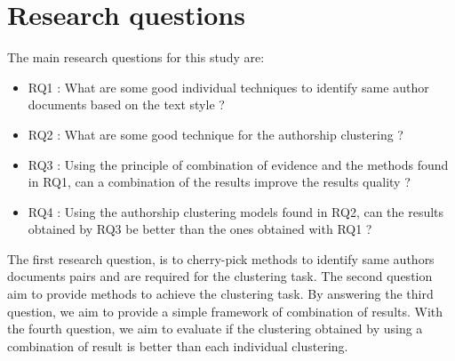 \section{Research questions}

The main research questions for this study are:

\begin{itemize}
  \item
  RQ1 : What are some good individual techniques to identify same author documents based on the text style ?
  \item
  RQ2 : What are some good technique for the authorship clustering ?
  \item
  RQ3 : Using the principle of combination of evidence and the methods found in RQ1, can a combination of the results improve the results quality ?
  \item
  RQ4 : Using the authorship clustering models found in RQ2, can the results obtained by RQ3 be better than the ones obtained with RQ1 ?
\end{itemize}

The first research question, is to cherry-pick methods to identify same authors documents pairs and are required for the clustering task.
The second question aim to provide methods to achieve the clustering task.
By answering the third question, we aim to provide a simple framework of combination of results.
With the fourth question, we aim to evaluate if the clustering obtained by using a combination of result is better than each individual clustering.
